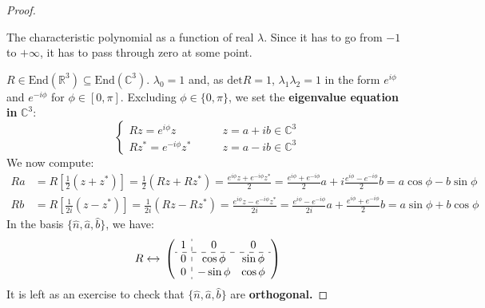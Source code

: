 \documentclass[../main.tex]{subfiles}
\begin{document}
\begin{proof}
\begin{marginfigure}[-30mm]
	\caption[The characteristic polynomial as a function of real $\lambda$.]{The characteristic polynomial as a function of real $\lambda$. Since it has to go from $-1$ to $+\infty$, it has to pass through zero at some point.}
\end{marginfigure}
 $R\in\text{End}(\mathbb{R}^3)\subseteq\text{End}(\mathbb{C}^3)$. $\lambda_0=1$ and, as $\text{det}R=1$, $\lambda_1\lambda_2=1$ in the form $e^{i\phi}$ and $e^{-i\phi}$ for $\phi\in[0,\pi]$. Excluding $\phi\in\{0,\pi\}$, we set the \textbf{eigenvalue equation in} $\mathbb{C}^3$:
\[
\begin{cases}
Rz=e^{i\phi}z \qquad &z=a+ib\in\mathbb{C}^3 \\    
Rz^*=e^{-i\phi}z^* \qquad & z=a-ib\in\mathbb{C}^3 
\end{cases}
\]
We now compute:
\begin{align*}
Ra&=R\left[\frac{1}{2}(z+z^*)\right]=\frac{1}{2}(Rz+Rz^*)=\frac{e^{i\phi}z+e^{-i\phi}z^*}{2}=\frac{e^{i\phi}+e^{-i\phi}}{2}a+i\frac{e^{i\phi}-e^{-i\phi}}{2}b=a\cos\phi-b\sin\phi\\
Rb&=R\left[\frac{1}{2i}(z-z^*)\right]=\frac{1}{2i}(Rz-Rz^*)=\frac{e^{i\phi}z-e^{-i\phi}z^*}{2i}=\frac{e^{i\phi}-e^{-i\phi}}{2i}a+\frac{e^{i\phi}+e^{-i\phi}}{2}b=a\sin\phi+b\cos\phi
\end{align*}
In the basis $\{\hat{n},\hat{a},\hat{b}\}$, we have:
\[
R\xleftrightarrow[]{}{}\left(\begin{array}{c:cc}
    1 & 0 & 0 \\
    \hdashline
    0 & \cos\phi & \sin\phi \\
    0 & -\sin\phi & \cos\phi
\end{array}
\right)
\]
It is left as an exercise to check that $\{\hat{n},\hat{a},\hat{b}\}$ are \textbf{orthogonal.}
\end{proof}
\end{document}
